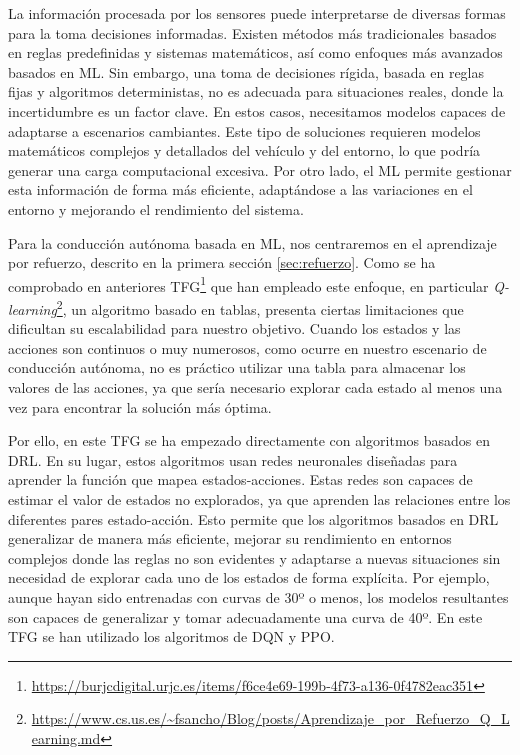 La información procesada por los sensores puede interpretarse de diversas formas para la toma decisiones informadas. Existen métodos más tradicionales basados en reglas predefinidas y sistemas matemáticos, así como enfoques más avanzados basados en \ac{ML}. Sin embargo, una toma de decisiones rígida, basada en reglas fijas y algoritmos deterministas, no es adecuada para situaciones reales, donde la incertidumbre es un factor clave. En estos casos, necesitamos modelos capaces de adaptarse a escenarios cambiantes. Este tipo de soluciones requieren modelos matemáticos complejos y detallados del vehículo y del entorno, lo que podría generar una carga computacional excesiva. Por otro lado, el \ac{ML} permite gestionar esta información de forma más eficiente, adaptándose a las variaciones en el entorno y mejorando el rendimiento del sistema.

Para la conducción autónoma basada en \ac{ML}, nos centraremos en el aprendizaje por refuerzo, descrito en la primera sección \ref{sec:refuerzo}. Como se ha comprobado en anteriores \ac{TFG}\footnote{\url{https://burjcdigital.urjc.es/items/f6ce4e69-199b-4f73-a136-0f4782eac351}} que han empleado este enfoque, en particular \textit{Q-learning}\footnote{\url{https://www.cs.us.es/~fsancho/Blog/posts/Aprendizaje_por_Refuerzo_Q_Learning.md}}, un algoritmo basado en tablas, presenta ciertas limitaciones que dificultan su escalabilidad para nuestro objetivo. Cuando los estados y las acciones son continuos o muy numerosos, como ocurre en nuestro escenario de conducción autónoma, no es práctico utilizar una tabla para almacenar los valores de las acciones, ya que sería necesario explorar cada estado al menos una vez para encontrar la solución más óptima. 

Por ello, en este \ac{TFG} se ha empezado directamente con algoritmos basados en \ac{DRL}. En su lugar, estos algoritmos usan redes neuronales diseñadas para aprender la función que mapea estados-acciones. Estas redes son capaces de estimar el valor de estados no explorados, ya que aprenden las relaciones entre los diferentes pares estado-acción. Esto permite que los algoritmos basados en \ac{DRL} generalizar de manera más eficiente, mejorar su rendimiento en entornos complejos donde las reglas no son evidentes y adaptarse a nuevas situaciones sin necesidad de explorar cada uno de los estados de forma explícita. Por ejemplo, aunque hayan sido entrenadas con curvas de 30º o menos, los modelos resultantes son capaces de generalizar y tomar adecuadamente una curva de 40º. En este \ac{TFG} se han utilizado los algoritmos de \ac{DQN} y \ac{PPO}.

